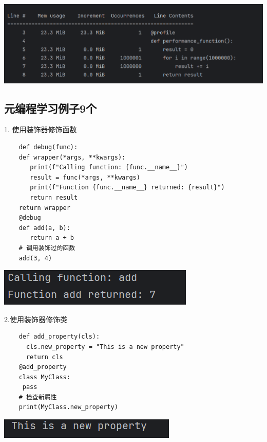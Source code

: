 \documentclass{article}
\begin{document}
\noindent
\begin{minipage}{\linewidth}
 \centering
  \includegraphics[width=0.5\linewidth]{学习8.png}
  \label{fig:example}
\end{minipage}

\subsection{元编程学习例子9个}

1. 使用装饰器修饰函数
\begin{verbatim}
    def debug(func):
    def wrapper(*args, **kwargs):
       print(f"Calling function: {func.__name__}")
       result = func(*args, **kwargs)
       print(f"Function {func.__name__} returned: {result}")
       return result
    return wrapper
    @debug
    def add(a, b):
       return a + b
    # 调用装饰过的函数
    add(3, 4)
\end{verbatim}

\begin{minipage}{\linewidth}
    \centering
     \includegraphics[width=0.5\linewidth]{学习9.png}
     \label{fig:example}
\end{minipage}


2.使用装饰器修饰类
\begin{verbatim}
    def add_property(cls):
      cls.new_property = "This is a new property"
      return cls
    @add_property
    class MyClass:
     pass
    # 检查新属性
    print(MyClass.new_property)
\end{verbatim}


\noindent
\begin{minipage}{\linewidth}
 \centering
  \includegraphics[width=0.5\linewidth]{学习10.png}
  \label{fig:example}
\end{minipage}
\end{document}
